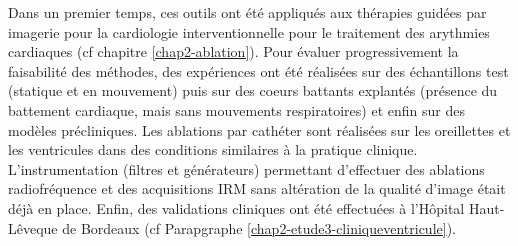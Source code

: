 
Dans un premier temps, ces outils ont été appliqués aux thérapies guidées par imagerie pour la cardiologie interventionnelle pour le traitement des arythmies cardiaques (cf chapitre \ref{chap2-ablation}). Pour évaluer progressivement la faisabilité des méthodes, des expériences ont été réalisées sur des échantillons test (statique et en mouvement) puis sur des coeurs battants explantés (présence du battement cardiaque, mais sans mouvements respiratoires) et enfin sur des modèles précliniques. Les ablations par cathéter sont réalisées sur les oreillettes et les ventricules dans des conditions similaires à la pratique clinique. L’instrumentation (filtres et générateurs) permettant d’effectuer des ablations radiofréquence et des acquisitions IRM sans altération de la qualité d’image était déjà en place. Enfin, des validations cliniques ont été effectuées à l’Hôpital Haut-Lêveque de Bordeaux (cf Parapgraphe \ref{chap2-etude3-cliniqueventricule}).\\
